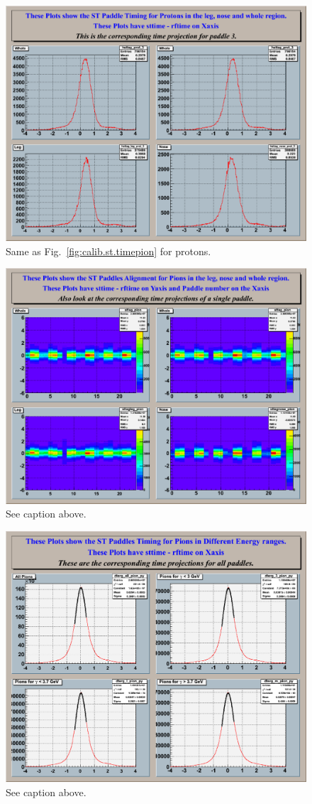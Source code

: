\begin{figure}[htbp]\begin{center}
\includegraphics[width=0.65\columnwidth]{figures/calib/st/Hpad3_sttag_prot.eps}
\caption[]{\label{fig:calib.st.timeproton}Same as Fig.~\ref{fig:calib.st.timepion} for protons.}
\end{center}\end{figure}

\begin{figure}[htbp]\begin{center}
\includegraphics[width=0.6\columnwidth]{figures/calib/st/Hsttag_pion.eps}
\caption[]{\label{fig:calib.st.timepion2d}See caption above.}
\end{center}\end{figure}

\begin{figure}[htbp]\begin{center}
\includegraphics[width=0.6\columnwidth]{figures/calib/st/Sterg_pion.eps}
\caption[]{\label{fig:calib.st.timepion.ebeam}See caption above.}
\end{center}\end{figure}


